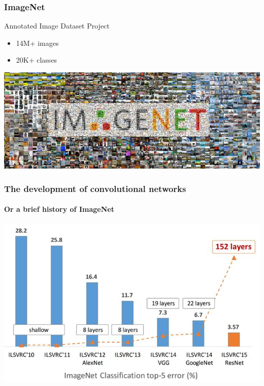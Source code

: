 \documentclass[fullscreen=true, bookmarks=true, hyperref={pdfencoding=unicode}]{beamer}
\begin{document}
\begin{frame}
  \frametitle{ImageNet}
  Annotated Image Dataset Project
  \begin{itemize}
      \item 14M+ images
      \item 20K+ classes
  \end{itemize}

  \begin{center}
  \includegraphics[keepaspectratio, width=0.9\paperwidth]{ImageNet-Large-Scale.jpg}      
  \end{center}
\end{frame} 


\begin{frame}
  \frametitle{The development of convolutional networks}
  \framesubtitle{Or a brief history of ImageNet}
  \begin{center}
    \includegraphics[keepaspectratio, height=0.7\paperheight]{image-net-history.jpg}
  \end{center}
\end{frame}
\end{document}
